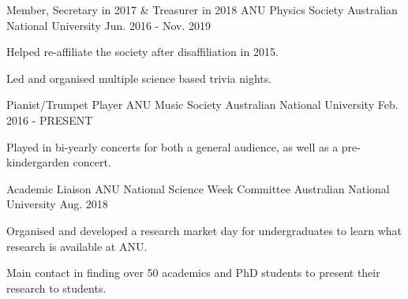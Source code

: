 

\begin{cventries}

  \cventry
    {Member, Secretary in 2017 \& Treasurer in 2018} %
    {ANU Physics Society} %
    {Australian National University} %
    {Jun. 2016 - Nov. 2019} %
    {
      \begin{cvitems} %
        \item {Helped re-affiliate the society after disaffiliation in 2015.}
        \item {Led and organised multiple science based trivia nights.}
      \end{cvitems}
    }

  \cventry
    {Pianist/Trumpet Player} %
    {ANU Music Society} %
    {Australian National University} %
    {Feb. 2016 - PRESENT} %
    {
      \begin{cvitems} %
        \item {Played in bi-yearly concerts for both a general audience, as well as a pre-kindergarden concert.}
      \end{cvitems}
    }
    
  \cventry
    {Academic Liaison} %
    {ANU National Science Week Committee} %
    {Australian National University} %
    {Aug. 2018} %
    {
      \begin{cvitems} %
        \item {Organised and developed a research market day for undergraduates to learn what research is available at ANU.}
        \item {Main contact in finding over 50 academics and PhD students to present their research to students.}
      \end{cvitems}
    }


\end{cventries}
